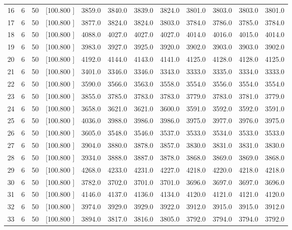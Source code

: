 \documentclass[12pt,a4paper]{article}
\begin{document}
\begin{center}
{\begin{tabular}{r r r r r r r r r r r r}
  16&  6& 50&[100.800   ]&  3859.0&  3840.0&  3839.0&  3824.0&  3801.0&  3803.0&  3803.0&  3801.0\\[-0.02in]
  17&  6& 50&[100.800   ]&  3877.0&  3824.0&  3824.0&  3803.0&  3784.0&  3786.0&  3785.0&  3784.0\\[-0.02in]
  18&  6& 50&[100.800   ]&  4088.0&  4027.0&  4027.0&  4027.0&  4014.0&  4016.0&  4015.0&  4014.0\\[-0.02in]
  19&  6& 50&[100.800   ]&  3983.0&  3927.0&  3925.0&  3920.0&  3902.0&  3903.0&  3903.0&  3902.0\\[-0.02in]
  20&  6& 50&[100.800   ]&  4192.0&  4144.0&  4143.0&  4141.0&  4125.0&  4128.0&  4128.0&  4125.0\\[-0.02in]
  21&  6& 50&[100.800   ]&  3401.0&  3346.0&  3346.0&  3343.0&  3333.0&  3335.0&  3334.0&  3333.0\\[-0.02in]
  22&  6& 50&[100.800   ]&  3590.0&  3566.0&  3563.0&  3558.0&  3554.0&  3556.0&  3554.0&  3554.0\\[-0.02in]
  23&  6& 50&[100.800   ]&  3855.0&  3785.0&  3783.0&  3783.0&  3779.0&  3783.0&  3781.0&  3779.0\\[-0.02in]
  24&  6& 50&[100.800   ]&  3658.0&  3621.0&  3621.0&  3600.0&  3591.0&  3592.0&  3592.0&  3591.0\\[-0.02in]
  25&  6& 50&[100.800   ]&  4036.0&  3988.0&  3986.0&  3986.0&  3975.0&  3977.0&  3976.0&  3975.0\\[-0.02in]
  26&  6& 50&[100.800   ]&  3605.0&  3548.0&  3546.0&  3537.0&  3533.0&  3534.0&  3533.0&  3533.0\\[-0.02in]
  27&  6& 50&[100.800   ]&  3904.0&  3880.0&  3878.0&  3857.0&  3830.0&  3831.0&  3831.0&  3830.0\\[-0.02in]
  28&  6& 50&[100.800   ]&  3934.0&  3888.0&  3887.0&  3878.0&  3868.0&  3869.0&  3869.0&  3868.0\\[-0.02in]
  29&  6& 50&[100.800   ]&  4268.0&  4233.0&  4231.0&  4227.0&  4218.0&  4220.0&  4218.0&  4218.0\\[-0.02in]
  30&  6& 50&[100.800   ]&  3782.0&  3702.0&  3701.0&  3701.0&  3696.0&  3697.0&  3697.0&  3696.0\\[-0.02in]
  31&  6& 50&[100.800   ]&  4146.0&  4137.0&  4136.0&  4134.0&  4120.0&  4121.0&  4121.0&  4120.0\\[-0.02in]
  32&  6& 50&[100.800   ]&  3974.0&  3929.0&  3929.0&  3922.0&  3912.0&  3915.0&  3915.0&  3912.0\\[-0.02in]
  33&  6& 50&[100.800   ]&  3894.0&  3817.0&  3816.0&  3805.0&  3792.0&  3794.0&  3794.0&  3792.0\\[-0.02in]

\end{tabular}}
\end{center}
\end{document}
